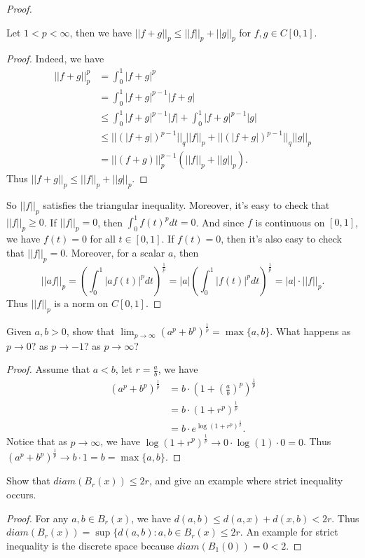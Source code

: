 \documentclass[12pt, a4paper]{article}
\theoremstyle{plain}
\begin{document}
\begin{proof}
		\begin{lemma}{3.8}
		Let $1<p<\infty$, then we have $||f+g||_p \leq ||f||_p + ||g||_p$ for $f,g\in C[0,1]$.
		\end{lemma}
		\begin{proof}
		Indeed, we have
		\begin{align*}
		||f+g||_p^p&=\int_{0}^{1}{|f+g|^p}\\
		&=\int_{0}^{1}{|f+g|^{p-1}|f+g|}\\
		&\leq \int_{0}^{1}{|f+g|^{p-1}|f|}+\int_{0}^{1}{|f+g|^{p-1}|g|}\\
		&\leq ||(|f+g|)^{p-1}||_q ||f||_p + ||(|f+g|)^{p-1}||_q ||g||_p\\
		&= ||(f+g)||_p^{p-1}(||f||_p + ||g||_p).
		\end{align*}
		Thus $||f+g||_p\leq ||f||_p + ||g||_p$.
		\end{proof}
		So $||f||_p$ satisfies the triangular inequality. Moreover, it's easy to check that $||f||_p\geq 0$. If $||f||_p=0$, then $\int_{0}^{1}{f(t)^pdt}=0$. And since $f$ is continuous on $[0,1]$, we have $f(t)=0$ for all $t\in [0,1]$. If $f(t)=0$, then it's also easy to check that $||f||_p=0$. Moreover, for a scalar $a$, then
		\[
		||af||_p=\left(\int_{0}^{1}{|af(t)|^pdt}\right)^\frac{1}{p} =|a|\left(\int_{0}^{1}{|f(t)|^pdt}\right)^\frac{1}{p}=|a|\cdot ||f||_p.
		\]
	Thus $||f||_p$ is a norm on $C[0,1]$.
	\end{proof}
	
\begin{exercise}{26}
Given $a,b>0$, show that $\lim_{p\rightarrow\infty}(a^p+b^p)^\frac{1}{p}=\max\{a,b\}$. What happens as $p\rightarrow 0$? as $p\rightarrow -1$? as $p\rightarrow\infty$?
\end{exercise}
	\begin{proof}
	Assume that $a<b$, let $r=\frac{a}{b}$, we have 
	\begin{align*}
	{(a^p + b^p)^\frac{1}{p}} &= b\cdot \left( 1+\left(\frac{a}{b}\right) ^p\right) ^\frac{1}{p}\\
	&= b\cdot\left(1+r^p\right)^\frac{1}{p}\\
	&=b\cdot e^{\log(1+r^p)^\frac{1}{p}}.
	\end{align*}
	Notice that as $p\rightarrow\infty$, we have $\log(1+r^p)^\frac{1}{p}\rightarrow 0\cdot \log(1)\cdot 0=0$. Thus $(a^p+b^p)^\frac{1}{p}\rightarrow b\cdot 1=b=\max\{a,b\}$.
	\end{proof}

\begin{exercise}{27}
Show that $diam(B_r(x))\leq 2r$, and give an example where strict inequality occurs.
\end{exercise}
	\begin{proof}
	For any $a,b\in B_r(x)$, we have $d(a,b)\leq d(a,x)+d(x,b)<2r$. Thus $diam(B_r(x))=\sup\{d(a,b):a,b\in B_r(x)\leq 2r$. An example for strict inequality is the discrete space because $diam(B_1(0))=0<2$.
	\end{proof}		
	
\end{document}
